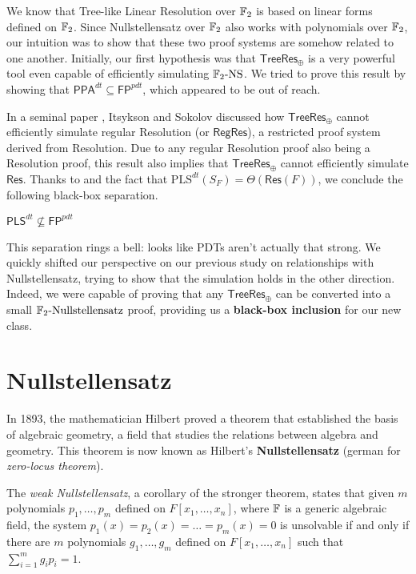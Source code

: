 We know that Tree-like Linear Resolution over $\mathbb{F}_2$ is based on linear forms defined on $\mathbb{F}_2$. Since Nullstellensatz over $\mathbb{F}_2$ also works with polynomials over $\mathbb{F}_2$, our intuition was to show that these two proof systems are somehow related to one another. Initially, our first hypothesis was that $\mathsf{TreeRes}_\oplus$ is a very powerful tool even capable of efficiently simulating $\mathrm{\mathbb{F}_2\text{-}NS}$. We tried to prove this result by showing that $\mathsf{PPA}^{dt} \subseteq \mathsf{FP}^{pdt}$, which appeared to be out of reach.

In a seminal paper \cite{res_lin_2}, Itsykson and Sokolov discussed how $\mathsf{TreeRes}_\oplus$ cannot efficiently simulate regular Resolution (or $\mathsf{RegRes}$), a restricted proof system derived from Resolution. Due to any regular Resolution proof also being a Resolution proof, this result also implies that $\mathsf{TreeRes}_\oplus$ cannot efficiently simulate $\mathsf{Res}$. Thanks to  and the fact that $\mathrm{PLS}^{dt}(S_F) = \Theta(\mathsf{Res}(F))$, we conclude the following black-box separation.

\begin{corollary}
    \label{pls_not_inside_fp_pdt}
    $\mathsf{PLS}^{dt} \not\subseteq \mathsf{FP}^{pdt}$
\end{corollary}

\newpage

This separation rings a bell: looks like PDTs aren't actually that strong. We quickly shifted our perspective on our previous study on relationships with Nullstellensatz, trying to show that the simulation holds in the other direction. Indeed, we were capable of proving that any $\mathsf{TreeRes}_\oplus$ can be converted into a small $\mathrm{\mathbb{F}_2\text{-}Nullstellensatz}$ proof, providing us a \textbf{black-box inclusion} for our new class.

\section{Nullstellensatz}

In 1893, the mathematician Hilbert proved a theorem that established the basis of algebraic geometry, a field that studies the relations between algebra and geometry. This theorem is now known as Hilbert's \textbf{Nullstellensatz} (german for \textit{zero-locus theorem}).

The \textit{weak Nullstellensatz}, a corollary of the stronger theorem, states that given $m$ polynomials $p_1, \ldots, p_m$ defined on $F[x_1, \ldots, x_n]$, where $\mathbb{F}$ is a generic algebraic field, the system $p_1(x) = p_2(x) = \ldots = p_m(x) = 0$ is unsolvable if and only if there are $m$ polynomials $g_1, \ldots, g_m$ defined on $F[x_1, \ldots, x_n]$ such that $\sum_{i=1}^m g_ip_i = 1$.


